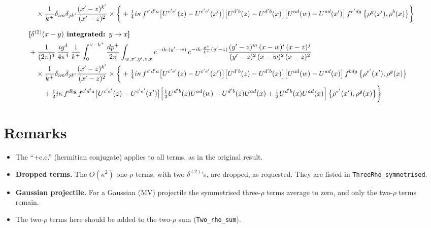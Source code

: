 \documentclass[10pt]{article}
\numberwithin{equation}{section}
\begin{document}
\begin{align}
&\quad\times\frac{1}{k^{+}}\delta_{im}\delta_{jk^{\prime}}\frac{(x^{\prime}-z)^{k^{\prime}}}{(x^{\prime}-z)^{2}}\times\bigg\{+\tfrac14 i\kappa\,f^{c^{\prime}d^{\prime}a}\big[U^{c^{\prime}e^{\prime}}(z)-U^{c^{\prime}e^{\prime}}(x^{\prime})\big]\big[U^{d^{\prime}b}(z)-U^{d^{\prime}b}(x)\big]\big[U^{ad}(w)-U^{ad}(x^{\prime})\big]\,f^{e^{\prime}dg}\,\big\{\rho^{g}(x^{\prime}),\rho^{b}(x)\big\}\bigg\}\notag\\[6pt]
&\textbf{[$\delta^{(2)}(x-y)$ integrated: $y\to x$]}\notag\\
&+\frac{1}{(2\pi)^{3}}\,\frac{ig^{4}}{4\pi^{4}}\,\frac{1}{k^{+}}\int_{0}^{\vee-k^{+}}\frac{dp^{+}}{2\pi}\int_{w,x^{\prime},y^{\prime},z,x}e^{-ik\cdot(y^{\prime}-w)}\,e^{-ik\cdot\frac{p^{+}}{k^{+}}(y^{\prime}-z)}\frac{(y^{\prime}-z)^{m}\,(x-w)^{i}\,(x-z)^{j}}{(y^{\prime}-z)^{2}\,(x-w)^{2}\,(x-z)^{2}}\notag\\
&\quad\times\frac{1}{k^{+}}\delta_{im}\delta_{jk^{\prime}}\frac{(x^{\prime}-z)^{k^{\prime}}}{(x^{\prime}-z)^{2}}\times\bigg\{+\tfrac14 i\kappa\,f^{c^{\prime}d^{\prime}a}\big[U^{c^{\prime}e^{\prime}}(z)-U^{c^{\prime}e^{\prime}}(x^{\prime})\big]\big[U^{d^{\prime}b}(z)-U^{d^{\prime}b}(x)\big]\big[U^{ad}(w)-U^{ad}(x)\big]\,f^{bdg}\,\big\{\rho^{e^{\prime}}(x^{\prime}),\rho^{g}(x)\big\}\notag\\&\qquad+\tfrac12 i\kappa\,f^{dbg}\,f^{c^{\prime}d^{\prime}a}\big[U^{c^{\prime}e^{\prime}}(z)-U^{c^{\prime}e^{\prime}}(x^{\prime})\big]\Big[\tfrac12U^{d^{\prime}b}(z)U^{ad}(w)-U^{d^{\prime}b}(z)U^{ad}(x)+\tfrac12U^{d^{\prime}b}(x)U^{ad}(x)\Big]\,\big\{\rho^{e^{\prime}}(x^{\prime}),\rho^{g}(x)\big\}\bigg\}
\end{align}
\section{Remarks}
\begin{itemize}
\item The ``$+$c.c.'' (hermitian conjugate) applies to all terms, as in the original result.
\item \textbf{Dropped terms.} The $O(\kappa^{2})$ one-$\rho$ terms, with two $\delta^{(2)}$'s, are dropped, as requested. They are listed in \texttt{ThreeRho\_symmetrised}.
\item \textbf{Gaussian projectile.} For a Gaussian (MV) projectile the symmetrised three-$\rho$ terms average to zero, and only the two-$\rho$ terms remain.
\item The two-$\rho$ terms here should be added to the two-$\rho$ sum (\texttt{Two\_rho\_sum}).
\end{itemize}
\end{document}
